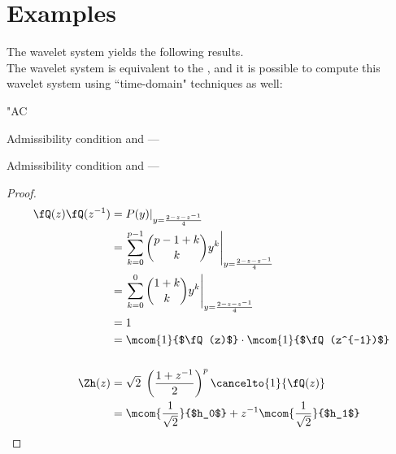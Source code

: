 \section{Examples}
\label{sec:examples_Dp}
\begin{example}
\label{ex:dau-p1}
The  wavelet system yields the following results.
\\
The  wavelet system is equivalent to the ,
and it is possible to compute this wavelet system using ``time-domain" techniques as well:
\begin{dingautolist}{"AC}
  \item Admissibility condition and ---
  \item Admissibility condition and ---
\end{dingautolist}
\end{example}
\begin{proof}
\begin{align*}
  \fQ(z)\fQ(z^{-1})
    &= P(y)|_{y=\frac{2-z-z^{-1}}{4}}
  \\&= \left.
       \sum\limits_{k=0}^{p-1} {{p-1+k}\choose{k}} y^k
       \right|_{y=\frac{2-z-z^{-1}}{4}}
  \\&= \left.
         \sum\limits_{k=0}^{0} {{1+k}\choose{k}} y^k
       \right|_{y=\frac{2-z-z^{-1}}{4}}
  \\&= 1
  \\&= \mcom{1}{$\fQ(z)$} \cdot \mcom{1}{$\fQ(z^{-1})$}
\\
\\
  \Zh(z)
    &= \sqrt{2}\;
       \left(\frac{1+z^{-1}}{2}\right)^p
       \cancelto{1}{\fQ(z)}
  \\&=        \mcom{\frac{1}{\sqrt{2}}}{$h_0$} +
       z^{-1} \mcom{\frac{1}{\sqrt{2}}}{$h_1$}
\end{align*}
\end{proof}

